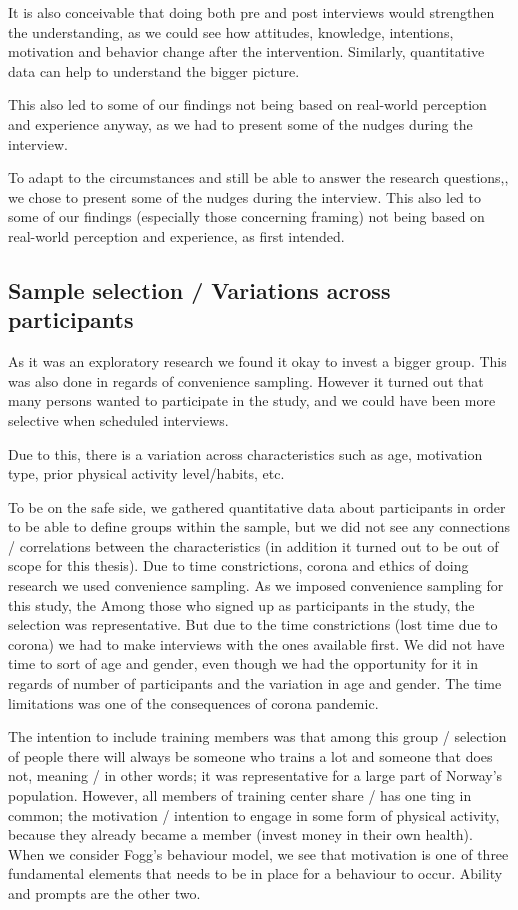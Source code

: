 It is also conceivable that doing both pre and post interviews would strengthen the understanding, as we could see how attitudes, knowledge, intentions, motivation and behavior change after the intervention. Similarly, quantitative data can help to understand the bigger picture.

This also led to some of our findings not being based on real-world perception and experience anyway, as we had to present some of the nudges during the interview.

To adapt to the circumstances and still be able to answer the research questions,, we chose to present some of the nudges during the interview. This also led to some of our findings (especially those concerning framing) not being based on real-world perception and experience, as first intended. 

\subsection{Sample selection / Variations across participants}
As it was an exploratory research we found it okay to invest a bigger group. This was also done in regards of convenience sampling. However it turned out that many persons wanted to participate in the study, and we could have been more selective when scheduled interviews. 

Due to this, there is a variation across characteristics such as age, motivation type, prior physical activity level/habits, etc. 

To be on the safe side, we gathered quantitative data about participants in order to be able to define groups within the sample, but we did not see any connections / correlations between the characteristics (in addition it turned out to be out of scope for this thesis). 
Due to time constrictions, corona and ethics of doing research we used convenience sampling. As we imposed convenience sampling for this study, the 
Among those who signed up as participants in the study, the selection was representative. But due to the time constrictions (lost time due to corona) we had to make interviews with the ones available first. We did not have time to sort of age and gender, even though we had the opportunity for it in regards of number of participants and the variation in age and gender. The time limitations was one of the consequences of corona pandemic. 

The intention to include training members was that among this group / selection of people there will always be someone who trains a lot and someone that does not, meaning / in other words; it was representative for a large part of Norway's population. However, all members of training center share / has one ting in common; the motivation / intention to engage in some form of physical activity, because they already became a member (invest money in their own health). When we consider Fogg's behaviour model, we see that motivation is one of three fundamental elements that needs to be in place for a behaviour to occur. Ability and prompts are the other two. 

